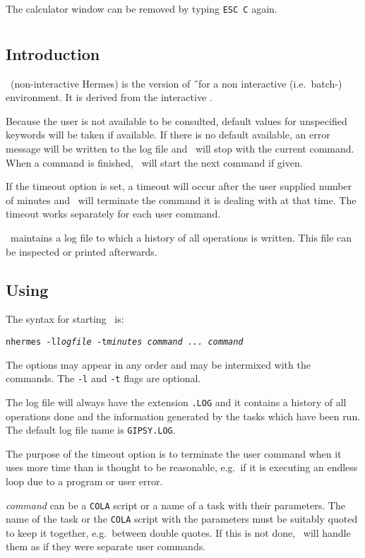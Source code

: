 The calculator window can be removed by typing {\tt ESC C} again.

\chapter{\nH}
\section{Introduction}
\nH\ (non-interactive Hermes) is the version of \H\ for a
non interactive (i.e.\ batch-)  environment.
It is derived from the interactive \tH.

Because the user is not available to be consulted,
default values for unspecified keywords will be taken if available.
If there is no default available, an error message will be written to the log
file and \nH\ will stop with the current command.
When a command is finished, \nH\ will start the next command if given.

If the timeout option is set, a timeout will occur after the user supplied
number of minutes and \nH\ will terminate the command it is
dealing with at that time.
The timeout works separately for each user command.

\nH\ maintains a log file to which a history of all operations is written.
This file can be inspected or printed afterwards.

\section{Using \nH}
The syntax for starting \nH\ is:
\begin{flushleft}
{\tt nhermes -l{\it logfile} -t{\it minutes} {\it command ... command}}
\end{flushleft}

The options may appear in any order and may be intermixed with the
commands. The {\tt -l} and {\tt -t} flags are optional.

The log file will always have the extension {\tt .LOG}
and it contains a history of all operations done and the information
generated by the tasks which have been run.
The default log file name is {\tt GIPSY.LOG}.

The purpose of the timeout option is to terminate the user command when it
uses more time than is thought to be reasonable, e.g.\ if it is executing an
endless loop due to a program or user error.

{\it command} can be a {\tt COLA} script or a name of a  task with their
parameters.
The name of the  task or the {\tt COLA} script with the
parameters must be suitably quoted to keep it together,
e.g.\ between double quotes. If this is not done,
\nH\ will handle them as if they were separate user commands.

